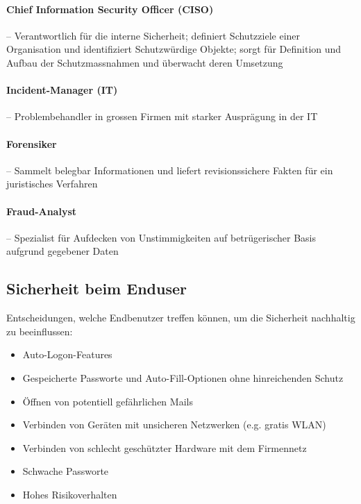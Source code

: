 \documentclass[a4paper,12pt]{article}
\begin{document}
\paragraph{Chief Information Security Officer (CISO)} -- Verantwortlich für die interne Sicherheit; definiert Schutzziele einer Organisation und identifiziert Schutzwürdige Objekte; sorgt für Definition und Aufbau der Schutzmassnahmen und überwacht deren Umsetzung

\paragraph{Incident-Manager (IT)} -- Problembehandler in grossen Firmen mit starker Ausprägung in der IT

\paragraph{Forensiker} -- Sammelt belegbar Informationen und liefert revisionssichere Fakten für ein juristisches Verfahren

\paragraph{Fraud-Analyst} -- Spezialist für Aufdecken von Unstimmigkeiten auf betrügerischer Basis aufgrund gegebener Daten

\subsection{Sicherheit beim Enduser}
Entscheidungen, welche Endbenutzer treffen können, um die Sicherheit nachhaltig zu beeinflussen:
\begin{itemize}
\item Auto-Logon-Features
\item Gespeicherte Passworte und Auto-Fill-Optionen ohne hinreichenden Schutz
\item Öffnen von potentiell gefährlichen Mails
\item Verbinden von Geräten mit unsicheren Netzwerken (e.g. gratis WLAN)
\item Verbinden von schlecht geschützter Hardware mit dem Firmennetz
\item Schwache Passworte
\item Hohes Risikoverhalten
\end{itemize}
\end{document}
